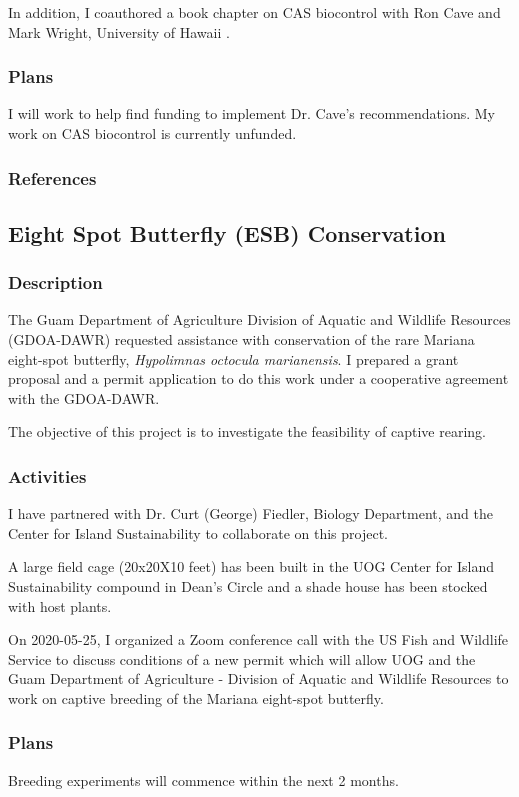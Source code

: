 \begin{refsection}
In addition, I coauthored a book chapter on CAS biocontrol with Ron Cave and Mark Wright, University of Hawaii \cite{cave_biological_2022}.

\subsubsection{Plans}

I will work to help find funding to implement Dr. Cave's recommendations. My work on CAS biocontrol is currently unfunded.

\subsubsection{References}
\printbibliography[heading=none]

\end{refsection}


\subsection{Eight Spot Butterfly (ESB) Conservation}
\begin{refsection}

\subsubsection{Description}

The Guam Department of Agriculture Division of Aquatic and Wildlife
Resources (GDOA-DAWR) requested assistance with conservation of the
rare Mariana eight-spot butterfly, \emph{Hypolimnas octocula marianensis}. I prepared a grant proposal and a permit application to do this work under a cooperative agreement with the GDOA-DAWR.

The objective of this project is to investigate the feasibility of captive rearing.

\subsubsection{Activities}

I have partnered with Dr. Curt (George) Fiedler, Biology Department, and the Center for Island Sustainability to collaborate on this project.

A large field cage (20x20X10 feet) has been built in the UOG Center for Island Sustainability compound in Dean's Circle and a shade house has been stocked with host plants. 

On 2020-05-25, I organized a Zoom conference call with the US Fish and Wildlife Service to discuss conditions of a new permit which will allow UOG and the Guam Department of Agriculture - Division of Aquatic and Wildlife Resources to work on captive breeding of the Mariana eight-spot butterfly.

\subsubsection{Plans}

Breeding experiments will commence within the next 2 months.

\end{refsection}


